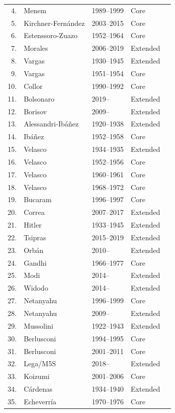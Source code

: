 {\begin{longtable}{rp{2.2cm}p{2.4cm}p{3.2cm}l}
4. & Menem & 1989--1999 & Core & \\
5. & Kirchner-Fern\'andez & 2003--2015 & Core & \\
6. & Estenssoro-Zuazo & 1952--1964 & Core & \\
7. & Morales & 2006--2019 & Extended & \\
8. & Vargas & 1930--1945 & Extended & \\
9. & Vargas & 1951--1954 & Core & \\
10. & Collor & 1990--1992 & Core & \\
11. & Bolsonaro & 2019-- & Extended & \\
12. & Borisov & 2009-- & Extended & \\
13. & Alessandri-Ib\'a\~nez & 1920--1938 & Extended & \\
14. & Ib\'a\~nez & 1952--1958 & Core & \\
15. & Velasco & 1934--1935 & Extended & \\
16. & Velasco & 1952--1956 & Core & \\
17. & Velasco & 1960--1961 & Core & \\
18. & Velasco & 1968--1972 & Core & \\
19. & Bucaram & 1996--1997 & Core & \\
20. & Correa & 2007--2017 & Extended & \\
21. & Hitler & 1933--1945 & Extended & \\
22. & Tsipras & 2015--2019 & Extended & \\
23. & Orb\'an & 2010-- & Extended & \\
24. & Gandhi & 1966--1977 & Core & \\
25. & Modi & 2014-- & Extended & \\
26. & Widodo & 2014-- & Extended & \\
27. & Netanyahu & 1996--1999 & Core & \\
28. & Netanyahu & 2009-- & Extended & \\
29. & Mussolini & 1922--1943 & Extended & \\
30. & Berlusconi & 1994--1995 & Core & \\
31. & Berlusconi & 2001--2011 & Core & \\
32. & Lega/M5S & 2018-- & Extended & \\
33. & Koizumi & 2001--2006 & Core & \\
34. & C\'ardenas & 1934--1940 & Extended & \\
35. & Echeverr\'ia & 1970--1976 & Core & \\

\end{longtable}}
